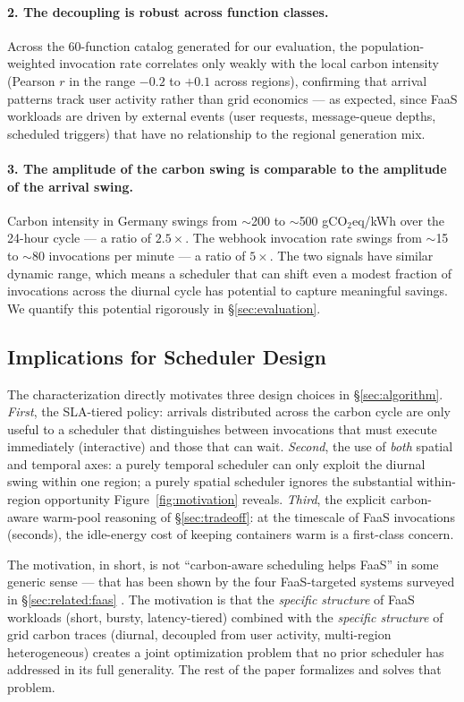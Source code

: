 \paragraph{2. The decoupling is robust across function classes.}
Across the 60-function catalog generated for our evaluation, the
population-weighted invocation rate correlates only weakly with the
local carbon intensity (Pearson $r$ in the range $-0.2$ to $+0.1$
across regions), confirming that arrival patterns track user activity
rather than grid economics --- as expected, since FaaS workloads are
driven by external events (user requests, message-queue depths,
scheduled triggers) that have no relationship to the regional
generation mix.

\paragraph{3. The amplitude of the carbon swing is comparable to the
amplitude of the arrival swing.} Carbon intensity in Germany swings
from $\sim$200 to $\sim$500 gCO$_2$eq/kWh over the 24-hour cycle ---
a ratio of $2.5\times$. The webhook invocation rate swings from
$\sim$15 to $\sim$80 invocations per minute --- a ratio of
$5\times$. The two signals have similar dynamic range, which means a
scheduler that can shift even a modest fraction of invocations
across the diurnal cycle has potential to capture meaningful savings.
We quantify this potential rigorously in \S\ref{sec:evaluation}.

\subsection{Implications for Scheduler Design}

The characterization directly motivates three design choices in
\S\ref{sec:algorithm}. \emph{First}, the SLA-tiered policy: arrivals
distributed across the carbon cycle are only useful to a scheduler
that distinguishes between invocations that must execute immediately
(interactive) and those that can wait. \emph{Second}, the use of
\emph{both} spatial and temporal axes: a purely temporal scheduler can
only exploit the diurnal swing within one region; a purely spatial
scheduler ignores the substantial within-region opportunity
Figure~\ref{fig:motivation} reveals. \emph{Third}, the explicit
carbon-aware warm-pool reasoning of \S\ref{sec:tradeoff}: at the
timescale of FaaS invocations (seconds), the idle-energy cost of
keeping containers warm is a first-class concern.

The motivation, in short, is not ``carbon-aware scheduling helps
FaaS'' in some generic sense --- that has been shown by the four
FaaS-targeted systems surveyed in \S\ref{sec:related:faas}
\citep{chadha2023greencourier,gsteiger2024caribou,jiang2024ecolife,qi2024casa}.
The motivation is that the \emph{specific structure} of FaaS
workloads (short, bursty, latency-tiered) combined with the
\emph{specific structure} of grid carbon traces (diurnal, decoupled
from user activity, multi-region heterogeneous) creates a joint
optimization problem that no prior scheduler has addressed in its
full generality. The rest of the paper formalizes and solves that
problem.
